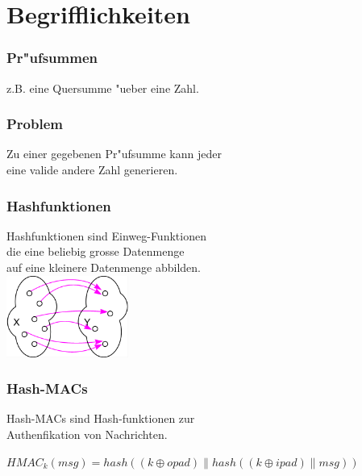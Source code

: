 \section{Begrifflichkeiten}
\begin{frame}
	\frametitle{Pr"ufsummen}
	z.B. eine Quersumme "ueber eine Zahl.

\end{frame}

\begin{frame}
	\frametitle{Problem}
	Zu einer gegebenen Pr"ufsumme kann jeder\\
	eine valide andere Zahl generieren.
\end{frame}

\begin{frame}
	\frametitle{Hashfunktionen}
	\begin{center}
		Hashfunktionen sind Einweg-Funktionen\\
		die eine beliebig grosse Datenmenge\\
		auf eine kleinere Datenmenge abbilden.\\
		\vspace{1cm}
		\includegraphics[width=4cm]{surjektiv.png}
	\end{center}
\end{frame}

\begin{frame}
	\frametitle{Hash-MACs}
	\begin{center}
		Hash-MACs sind Hash-funktionen zur\\
		Authenfikation von Nachrichten.
		\\
		\begin{center}
			$HMAC_k(msg) = hash((k \oplus opad) \parallel hash((k \oplus ipad)\parallel msg) )$
		\end{center}
	\end{center}
\end{frame}
